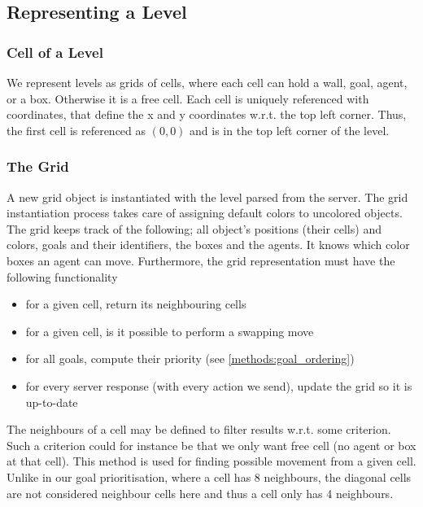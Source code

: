 \subsection{Representing a Level}
\label{sec:representing a level}

\subsubsection{Cell of a Level}

We represent levels as grids of cells, where each cell can hold a wall, goal, agent, or a box.
Otherwise it is a free cell.
Each cell is uniquely referenced with coordinates, that define the x and y coordinates w.r.t. the top left corner.
Thus, the first cell is referenced as $(0,0)$ and is in the top left corner of the level.

\subsubsection{The Grid}

A new grid object is instantiated with the level parsed from the server.
The grid instantiation process takes care of assigning default colors to uncolored objects.
The grid keeps track of the following; all object's positions (their cells) and colors, goals and their identifiers, the boxes and the agents.
It knows which color boxes an agent can move.
Furthermore, the grid representation must have the following functionality
%
\begin{itemize}
  \item for a given cell, return its neighbouring cells
  \item for a given cell, is it possible to perform a swapping move
  \item for all goals, compute their priority (see \cref{methods:goal_ordering})
  \item for every server response (with every action we send), update the grid so it is up-to-date
\end{itemize}
%
The neighbours of a cell may be defined to filter results w.r.t. some criterion.
Such a criterion could for instance be that we only want free cell (no agent or box at that cell).
This method is used for finding possible movement from a given cell.
Unlike in our goal prioritisation, where a cell has 8 neighbours, the diagonal cells are not considered neighbour cells here and thus a cell only has 4 neighbours.

